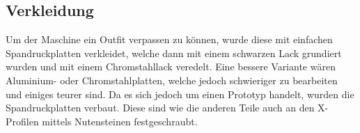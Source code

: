 \subsection{Verkleidung}
\label{subsec:Verkleidung}

Um der Maschine ein Outfit verpassen zu können, wurde diese mit einfachen Spandruckplatten verkleidet, welche dann mit einem schwarzen Lack grundiert wurden und mit einem Chromstahllack veredelt. Eine bessere Variante wären Aluminium- oder Chromstahlplatten, welche jedoch schwieriger zu bearbeiten und einiges teurer sind. Da es sich jedoch um einen Prototyp handelt, wurden die Spandruckplatten verbaut. Diese sind wie die anderen Teile auch an den X-Profilen mittels Nutensteinen festgeschraubt. 